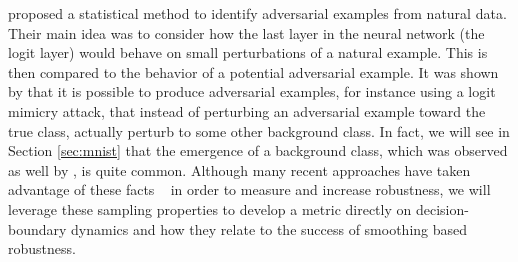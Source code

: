 



\citet{roth19aodds} proposed a statistical method to identify adversarial examples from natural data. Their main idea was to consider how the last layer in the neural network (the logit layer) would behave on small perturbations of a natural example. %
This is then compared to the behavior of a potential adversarial example. 
It was shown by \citet{hosseini2019odds} that it is possible to produce adversarial examples, for instance using a logit mimicry attack, that instead of perturbing an adversarial example toward the true class, actually perturb to some other background class. In fact, we will see in Section \ref{sec:mnist} that the emergence of a background class, which was observed as well by \citet{roth19aodds}, is quite common. Although many recent approaches have taken advantage of these facts ~\cite{taori2020shifts, lu2022randommasking, Osada_2023_WACV, blau2023classifier} in order to measure and increase robustness, we will leverage these sampling properties to develop a metric directly on decision-boundary dynamics and how they relate to the success of smoothing based robustness. 

